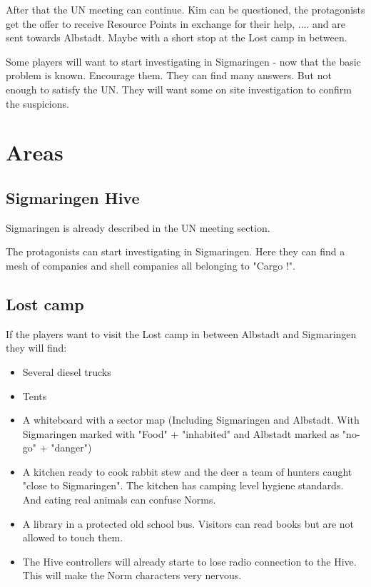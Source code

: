 After that the UN meeting can continue. Kim can be questioned, the protagonists get the offer to receive Resource Points in exchange for their help, .... and are sent towards Albstadt. Maybe with a short stop at the Lost camp in between.

Some players will want to start investigating in Sigmaringen - now that the basic problem is known. Encourage them. They can find many answers. But not enough to satisfy the UN. They will want some on site investigation to confirm the suspicions.

\section{Areas}

\subsection{Sigmaringen Hive}

Sigmaringen is already described in the UN meeting section.

The protagonists can start investigating in Sigmaringen. Here they can find a mesh of companies and shell companies all belonging to "Cargo !".

\subsection{Lost camp}

If the players want to visit the Lost camp in between Albstadt and Sigmaringen they will find:

\begin{itemize}
    \item Several diesel trucks
    \item Tents
    \item A whiteboard with a sector map (Including Sigmaringen and Albstadt. With Sigmaringen marked with "Food" + "inhabited" and Albstadt marked as "no-go" + "danger")
    \item A kitchen ready to cook rabbit stew and the deer a team of hunters caught "close to Sigmaringen". The kitchen has camping level hygiene standards. And eating real animals can confuse Norms.
    \item A library in a protected old school bus. Visitors can read books but are not allowed to touch them.
    \item The Hive controllers will already starte to lose radio connection to the Hive. This will make the Norm characters very nervous.
\end{itemize}

